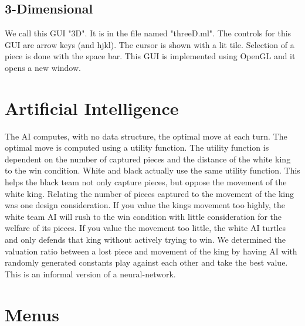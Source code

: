 \documentclass[11pt, oneside]{article}
\begin{document}
\subsection{3-Dimensional}
We call this GUI "3D". It is in the file named "threeD.ml".  The controls for this GUI are arrow keys (and hjkl).  The cursor is shown with a lit tile.  Selection of a piece is done with the space bar.  This GUI is implemented using OpenGL and it opens a new window.

\section{Artificial Intelligence}
The AI computes, with no data structure, the optimal move at each turn.  The optimal move is computed using a utility function.  The utility function is dependent on the number of captured pieces and the distance of the white king to the win condition.  White and black actually use the same utility function.  This helps the black team not only capture pieces, but oppose the movement of the white king.  Relating the number of pieces captured to the movement of the king was one design consideration.  If you value the kings movement too highly, the white team AI will rush to the win condition with little consideration for the welfare of its pieces.  If you value the movement too little, the white AI turtles and only defends that king without actively trying to win.  We determined the valuation ratio between a lost piece and movement of the king by having AI with randomly generated constants play against each other and take the best value.  This is an informal version of a neural-network.

\section{Menus}
\end{document}
